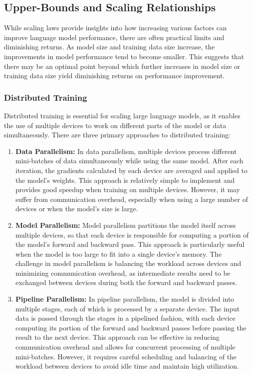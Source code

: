 \documentclass[12pt]{article}
\begin{document}
\subsection{Upper-Bounds and Scaling Relationships}
While scaling laws provide insights into how increasing various factors can improve language model performance, there are often practical limits and diminishing returns. As model size and training data size increase, the improvements in model performance tend to become smaller. This suggests that there may be an optimal point beyond which further increases in model size or training data size yield diminishing returns on performance improvement.

\subsubsection{Distributed Training}
Distributed training is essential for scaling large language models, as it enables the use of multiple devices to work on different parts of the model or data simultaneously. There are three primary approaches to distributed training:

\begin{enumerate}
\item \textbf{Data Parallelism:} In data parallelism, multiple devices process different mini-batches of data simultaneously while using the same model. After each iteration, the gradients calculated by each device are averaged and applied to the model's weights. This approach is relatively simple to implement and provides good speedup when training on multiple devices. However, it may suffer from communication overhead, especially when using a large number of devices or when the model's size is large.

\item \textbf{Model Parallelism:} Model parallelism partitions the model itself across multiple devices, so that each device is responsible for computing a portion of the model's forward and backward pass. This approach is particularly useful when the model is too large to fit into a single device's memory. The challenge in model parallelism is balancing the workload across devices and minimizing communication overhead, as intermediate results need to be exchanged between devices during both the forward and backward passes.

\item \textbf{Pipeline Parallelism:} In pipeline parallelism, the model is divided into multiple stages, each of which is processed by a separate device. The input data is passed through the stages in a pipelined fashion, with each device computing its portion of the forward and backward passes before passing the result to the next device. This approach can be effective in reducing communication overhead and allows for concurrent processing of multiple mini-batches. However, it requires careful scheduling and balancing of the workload between devices to avoid idle time and maintain high utilization.
\end{enumerate}
\end{document}
